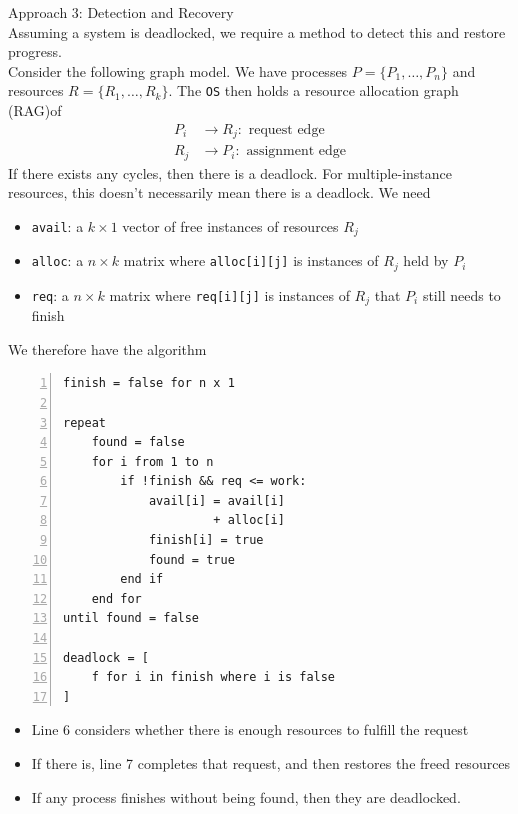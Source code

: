 \documentclass[journal, letterpaper]{IEEEtran}
\begin{document}
\begin{theory}{Approach 3: Detection and Recovery} \\
    Assuming a system is deadlocked, we require a method to detect this and restore progress.
    \newline \\ 
    Consider the following graph model. We have processes $P = \{P_1, \dots, P_n\}$ and resources $R = \{R_1, \dots, R_k\}$. The \verb|OS| then holds a resource allocation graph (RAG)of
    \begin{align}
        P_i &\to R_j: \text{ request edge} \\
        R_j &\to P_i: \text{ assignment edge}
    \end{align}
    If there exists any cycles, then there is a deadlock. For multiple-instance resources,  this doesn't necessarily mean there is a deadlock. We need
    \begin{itemize}
        \item \verb|avail|: a $k \times 1$ vector of free instances of resources $R_j$
        \item \verb|alloc|: a $n \times k$ matrix where \verb|alloc[i][j]| is instances of $R_j$ held by $P_i$
        \item \verb|req|: a $n \times k$ matrix where \verb|req[i][j]| is instances of $R_j$ that $P_i$ still needs to finish
    \end{itemize}
    We therefore have the algorithm
{\small
\begin{Verbatim}[numbers=left, numbersep=2mm, frame=single]
finish = false for n x 1

repeat
    found = false
    for i from 1 to n
        if !finish && req <= work:
            avail[i] = avail[i] 
                     + alloc[i]
            finish[i] = true
            found = true
        end if
    end for
until found = false

deadlock = [
    f for i in finish where i is false
]
\end{Verbatim}
}
\begin{itemize}
    \item Line 6 considers whether there is enough resources to fulfill the request
    \item If there is, line 7 completes that request, and then restores the freed resources
    \item If any process finishes without being found, then they are deadlocked.
\end{itemize}
\end{theory}
\end{document}
